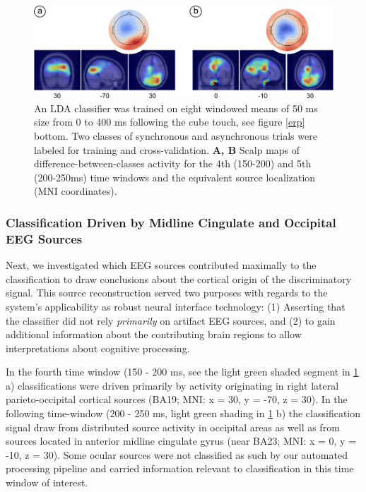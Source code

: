 \begin{figure}
  \includegraphics[width=\textwidth]{figures/fig_localization.jpg}
  \caption{An LDA classifier was trained on eight windowed means of 50 ms size from 0 to 400 ms following the cube touch, see figure \ref{erp} bottom. Two classes of synchronous and asynchronous trials were labeled for training and cross-validation. \textbf{A, B} Scalp maps of difference-between-classes activity for the 4th (150-200) and 5th (200-250ms) time windows and the equivalent source localization (MNI coordinates).}
  \label{lda_loc}
\end{figure}

\subsubsection{Classification Driven by Midline Cingulate and Occipital EEG Sources}

Next, we investigated which EEG sources contributed maximally to the classification to draw conclusions about the cortical origin of the discriminatory signal. This source reconstruction served two purposes with regards to the system's applicability as robust neural interface technology: (1) Asserting that the classifier did not rely \textit{primarily} on artifact EEG sources, and (2) to gain additional information about the contributing brain regions to allow interpretations about cognitive processing.

In the fourth time window (150 - 200 ms, see the light green shaded segment in \ref{lda_loc} a) classifications were driven primarily by activity originating in right lateral parieto-occipital cortical sources (BA19; MNI: x = 30, y = -70, z = 30). In the following time-window (200 - 250 ms, light green shading in \ref{lda_loc} b) the classification signal draw from distributed source activity in occipital areas as well as from sources located in anterior midline cingulate gyrus (near BA23; MNI: x = 0, y = -10, z = 30). Some ocular sources were not classified as such by our automated processing pipeline and carried information relevant to classification in this time window of interest.